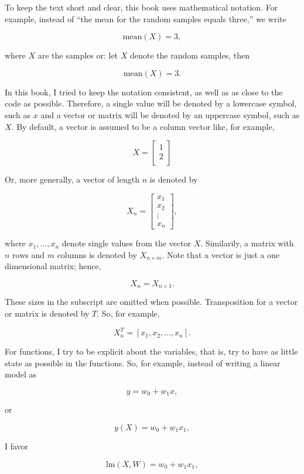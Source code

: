 \documentclass[
  14pt
  american,
  paper=a4,
  ,captions=tableheading
]{scrbook}
\begin{document}
To keep the text short and clear, this book uses mathematical notation.
For example, instead of ``the mean for the random samples equals
three,'' we write

\[ \text{mean}(X) = 3, \]

where \(X\) are the samples or: let \(X\) denote the random samples,
then

\[ \text{mean}(X) = 3. \]

In this book, I tried to keep the notation consistent, as well as as
close to the code as possible. Therefore, a single value will be denoted
by a lowercase symbol, such as \(x\) and a vector or matrix will be
denoted by an uppercase symbol, such as \(X\). By default, a vector is
assumed to be a column vector like, for example,

\[ X = \begin{bmatrix}
           1 \\
           2 \\
         \end{bmatrix} \]

Or, more generally, a vector of length \(n\) is denoted by

\[ X_{n} = \begin{bmatrix}
           x_1 \\
           x_2 \\
           \vdots \\
           x_n
         \end{bmatrix}, \]

where \(x_1, ..., x_n\) denote single values from the vector \(X\).
Similarily, a matrix with \(n\) rows and \(m\) columns is denoted by
\(X_{n \times m}\). Note that a vector is just a one dimensional matrix;
hence,

\[ X_{n} = X_{n \times 1}. \]

These sizes in the subscript are omitted when possible. Transposition
for a vector or matrix is denoted by \(T\). So, for example,

\[ X_n^T = [ x_1, x_2, ..., x_n ]. \]

For functions, I try to be explicit about the variables, that is, try to
have as little state as possible in the functions. So, for example,
instead of writing a linear model as

\[ y = w_0 + w_1 x, \]

or

\[ y(X) = w_0 + w_1 x_1, \]

I favor

\[ \text{lm}(X, W) = w_0 + w_1 x_1, \]
\end{document}
